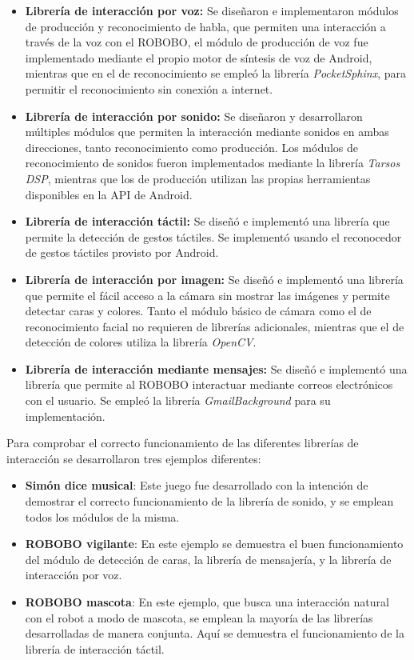 \begin{itemize}
 	\item \textbf{Librería de interacción por voz:} Se diseñaron e implementaron módulos de producción y reconocimiento de habla, que permiten una interacción a través de la voz con el ROBOBO, el módulo de producción de voz fue implementado mediante el propio motor de síntesis de voz de Android, mientras que en el de reconocimiento se empleó la librería \textit{PocketSphinx}, para permitir el reconocimiento sin conexión a internet. 
	\item \textbf{Librería de interacción por sonido:} Se diseñaron y desarrollaron múltiples módulos que permiten la interacción mediante sonidos en ambas direcciones, tanto reconocimiento como producción. Los módulos de reconocimiento de sonidos fueron implementados mediante la librería \textit{Tarsos DSP}, mientras que los de producción utilizan las propias herramientas disponibles en la API de Android.
	\item \textbf{Librería de interacción táctil:} Se diseñó e implementó una librería que permite la detección de gestos táctiles. Se implementó usando el reconocedor de gestos táctiles provisto por Android.
	\item \textbf{Librería de interacción por imagen:} Se diseñó e implementó una librería que permite el fácil acceso a la cámara sin mostrar las imágenes y permite detectar caras y colores. Tanto el módulo básico de cámara como el de reconocimiento facial no requieren de librerías adicionales, mientras que el de detección de colores utiliza la librería \textit{OpenCV}.
	\item \textbf{Librería de interacción mediante mensajes:} Se diseñó e implementó una librería que permite al ROBOBO interactuar mediante correos electrónicos con el usuario. Se empleó la librería \textit{GmailBackground} para su implementación.
 \end{itemize} 
 
 Para comprobar el correcto funcionamiento de las diferentes librerías de interacción se desarrollaron tres ejemplos diferentes:
 \begin{itemize}
 	\item \textbf{Simón dice musical}: Este juego fue desarrollado con la intención de demostrar el correcto funcionamiento de la librería de sonido, y se emplean todos los módulos de la misma.
 	\item \textbf{ROBOBO vigilante}: En este ejemplo se demuestra el buen funcionamiento del módulo de detección de caras, la librería de mensajería, y la librería de interacción por voz.
 	\item \textbf{ROBOBO mascota}: En este ejemplo, que busca una interacción natural con el robot a modo de mascota, se emplean la mayoría de las librerías desarrolladas de manera conjunta. Aquí se demuestra el funcionamiento de la librería de interacción táctil.
 \end{itemize}
 
